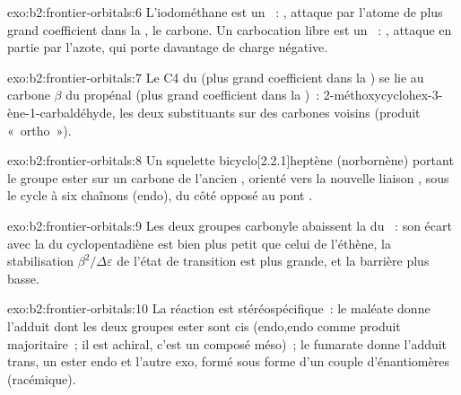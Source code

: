 \begin{solution}{exo:b2:frontier-orbitals:6}
L'iodométhane est un ~: , attaque par l'atome de plus grand
coefficient dans la , le carbone. Un carbocation libre est un ~: ,
attaque en partie par l'azote, qui porte davantage de charge négative.
\end{solution}

\begin{solution}{exo:b2:frontier-orbitals:7}
Le C4 du  (plus grand coefficient dans la ) se lie au carbone $\beta$ du propénal (plus grand
coefficient dans la )~: 2-méthoxycyclohex-3-ène-1-carbaldéhyde, les deux substituants sur
des carbones voisins (produit «~ortho~»).
\end{solution}

\begin{solution}{exo:b2:frontier-orbitals:8}
Un squelette bicyclo[2.2.1]heptène (norbornène) portant le groupe ester sur un carbone de
l'ancien , orienté vers la nouvelle liaison , sous le cycle à six chaînons
(endo), du côté opposé au pont .
\end{solution}

\begin{solution}{exo:b2:frontier-orbitals:9}
Les deux groupes carbonyle abaissent la  du ~: son écart avec la  du
cyclopentadiène est bien plus petit que celui de l'éthène, la stabilisation $\beta^2/\Delta\varepsilon$ de
l'état de transition est plus grande, et la barrière plus basse.
\end{solution}

\begin{solution}{exo:b2:frontier-orbitals:10}
La réaction est stéréospécifique~: le maléate donne l'adduit dont les deux groupes ester sont cis
(endo,endo comme produit majoritaire~; il est achiral, c'est un composé méso)~; le fumarate donne
l'adduit trans, un ester endo et l'autre exo, formé sous forme d'un couple d'énantiomères (racémique).
\end{solution}

